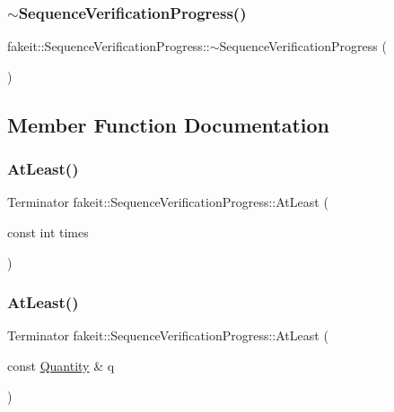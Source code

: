 \subsubsection{\texorpdfstring{$\sim$SequenceVerificationProgress()}{~SequenceVerificationProgress()}\hspace{0.1cm}{\footnotesize\ttfamily [9/9]}}
{\footnotesize\ttfamily fakeit\+::\+Sequence\+Verification\+Progress\+::$\sim$\+Sequence\+Verification\+Progress (\begin{DoxyParamCaption}{ }\end{DoxyParamCaption})\hspace{0.3cm}{\ttfamily [inline]}}



\subsection{Member Function Documentation}
\mbox{\label{classfakeit_1_1SequenceVerificationProgress_a83ba8d481bb79dad783f9bc821dd650e}} 
\subsubsection{\texorpdfstring{AtLeast()}{AtLeast()}\hspace{0.1cm}{\footnotesize\ttfamily [1/18]}}
{\footnotesize\ttfamily Terminator fakeit\+::\+Sequence\+Verification\+Progress\+::\+At\+Least (\begin{DoxyParamCaption}\item[{const int}]{times }\end{DoxyParamCaption})\hspace{0.3cm}{\ttfamily [inline]}}

\mbox{\label{classfakeit_1_1SequenceVerificationProgress_a1f6e949249d3f8119e920f6df6f7ade2}} 
\subsubsection{\texorpdfstring{AtLeast()}{AtLeast()}\hspace{0.1cm}{\footnotesize\ttfamily [2/18]}}
{\footnotesize\ttfamily Terminator fakeit\+::\+Sequence\+Verification\+Progress\+::\+At\+Least (\begin{DoxyParamCaption}\item[{const \mbox{\hyperlink{structfakeit_1_1Quantity}{Quantity}} \&}]{q }\end{DoxyParamCaption})\hspace{0.3cm}{\ttfamily [inline]}}

